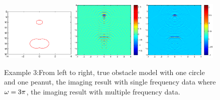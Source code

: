 \documentclass[12pt]{iopart}
\begin{document}
\begin{figure}
	\centering
	\includegraphics[width=0.32\textwidth,height=0.16\textheight]{./graphic/circle_0_4_peanut_1_profile.eps}
	\includegraphics[width=0.32\textwidth]{./graphic/circle_0_4_peanut_1_3pi_1.eps}
	\includegraphics[width=0.32\textwidth]{./graphic/circle_0_4_peanut_1_multi_1.eps}
	
	\caption{Example 3:From left to right,  true obstacle model with one circle and one peanut, the imaging result
		with single frequency data where $\omega=3\pi$, the imaging result with multiple frequency data.}\label{figure_32}
\end{figure}
\end{document}

